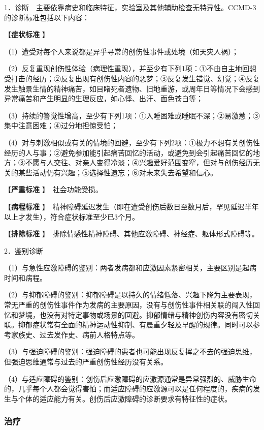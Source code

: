 1．诊断　主要依靠病史和临床特征，实验室及其他辅助检查无特异性。CCMD-3的诊断标准包括以下内容：

【\textbf{症状标准} 】

（1）遭受对每个人来说都是异乎寻常的创伤性事件或处境（如天灾人祸）；

（2）反复重现创伤性体验（病理性重现），并至少有下列1项：①不由自主地回想受打击的经历；②反复出现有创伤性内容的恶梦；③反复发生错觉、幻觉；④反复发生触景生情的精神痛苦，如目睹死者遗物、旧地重游，或周年日等情况下会感到异常痛苦和产生明显的生理反应，如心悸、出汗、面色苍白等；

（3）持续的警觉性增高，至少有下列1项：①入睡困难或睡眠不深；②易激惹；③集中注意困难；④过分地担惊受怕；

（4）对与刺激相似或有关的情境的回避，至少有下列2项：①极力不想有关创伤性经历的人与事；②避免参加能引起痛苦回忆的活动，或避免到会引起痛苦回忆的地方；③不愿与人交往、对亲人变得冷淡；④兴趣爱好范围变窄，但对与创伤经历无关的某些活动仍有兴趣；⑤选择性遗忘；⑥对未来失去希望和信心。

【\textbf{严重标准} 】　社会功能受损。

【\textbf{病程标准}
】　精神障碍延迟发生（即在遭受创伤后数日至数月后，罕见延迟半年以上才发生），符合症状标准至少已3个月。

【\textbf{排除标准}
】　排除情感性精神障碍、其他应激障碍、神经症、躯体形式障碍等。

2．鉴别诊断

（1）与急性应激障碍的鉴别：两者发病都和应激因素紧密相关，主要区别是起病时间和病程。

（2）与抑郁障碍的鉴别：抑郁障碍是以持久的情绪低落、兴趣下降为主要表现，常无严重的创伤性事件作为发病的主要原因，没有与创伤性事件相关联的闯入性回忆和梦境，也没有对特定事物或场景的回避。抑郁情绪与精神创伤内容没有密切关联。抑郁症状常有全面的精神运动性抑制、有晨重夕轻及早醒的规律。同时可以参考家族史、过去发作史、病前人格特点等。

（3）与强迫障碍的鉴别：强迫障碍的患者也可能出现反复挥之不去的强迫思维，但强迫思维通常与过去的严重创伤性经历没有关系。

（4）与适应障碍的鉴别：创伤后应激障碍的应激源通常是异常强烈的、威胁生命的，几乎每个人都会觉得害怕；而适应障碍的应激源可以是任何程度的，疾病的发生与个体的适应能力有关。创伤后应激障碍的诊断要求有特征性的症状。

\subsubsection{治疗}

